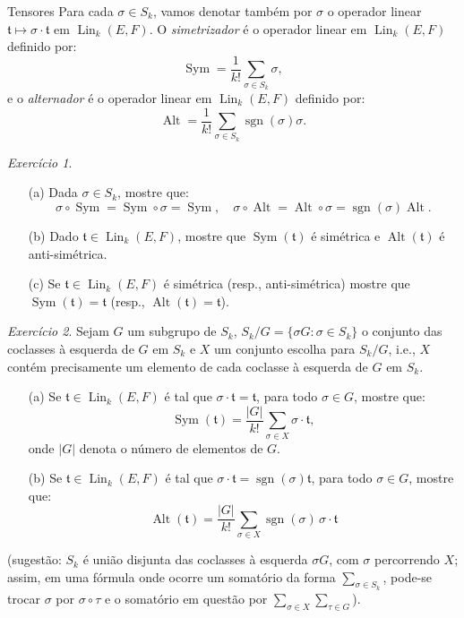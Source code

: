 \documentclass[oneside,11pt]{amsart}
\DeclareMathOperator{\Lin}{Lin}
\DeclareMathOperator{\sgn}{sgn}
\DeclareMathOperator{\Sym}{Sym}
\DeclareMathOperator{\Alt}{Alt}
\theoremstyle{remark}\newtheorem{exercise}{Exercício}[section]
\theoremstyle{plain}\newtheorem{teo}{Teorema}[section]
\theoremstyle{plain}\newtheorem{lem}[teo]{Lema}
\theoremstyle{plain}\newtheorem{prop}[teo]{Proposição}
\theoremstyle{definition}\newtheorem{defin}[teo]{Definição}
\theoremstyle{remark}\newtheorem{rem}[teo]{Observação}
\theoremstyle{definition}\newtheorem{example}[teo]{Exemplo}
\numberwithin{equation}{section}
\begin{document}
\begin{section}{Tensores}
Para cada $\sigma\in S_k$, vamos denotar também por $\sigma$ o operador linear $\mathfrak t\mapsto\sigma\cdot\mathfrak t$ em $\Lin_k(E,F)$.
O {\em simetrizador\/} é o operador linear em $\Lin_k(E,F)$ definido por:
\[\Sym=\frac1{k!}\sum_{\sigma\in S_k}\sigma,\]
e o {\em alternador\/} é o operador linear em $\Lin_k(E,F)$ definido por:
\[\Alt=\frac1{k!}\sum_{\sigma\in S_k}\sgn(\sigma)\sigma.\]

\begin{exercise}\label{exe:sigmaSymAlt}\
\begin{itemize}
\item[(a)] Dada $\sigma\in S_k$, mostre que:
\[\sigma\circ\Sym=\Sym\circ\sigma=\Sym,\quad\sigma\circ\Alt=\Alt\circ\sigma=\sgn(\sigma)\Alt.\]
\item[(b)] Dado $\mathfrak t\in\Lin_k(E,F)$, mostre que $\Sym(\mathfrak t)$ é simétrica e $\Alt(\mathfrak t)$ é anti-simétrica.
\item[(c)] Se $\mathfrak t\in\Lin_k(E,F)$ é simétrica (resp., anti-simétrica) mostre que $\Sym(\mathfrak t)=\mathfrak t$ (resp.,
$\Alt(\mathfrak t)=\mathfrak t$).
\end{itemize}
\end{exercise}

\begin{exercise}\label{exe:SymAltG}
Sejam $G$ um subgrupo de $S_k$, $S_k/G=\big\{\sigma G:\sigma\in S_k\big\}$ o conjunto das coclasses à esquerda de $G$ em $S_k$ e $X$ um conjunto escolha para
$S_k/G$, i.e., $X$ contém precisamente um elemento de cada coclasse à esquerda de $G$ em $S_k$.
\begin{itemize}
\item[(a)] Se $\mathfrak t\in\Lin_k(E,F)$ é tal que $\sigma\cdot\mathfrak t=\mathfrak t$, para todo $\sigma\in G$, mostre que:
\[\Sym(\mathfrak t)=\frac{\vert G\vert}{k!}\sum_{\sigma\in X}\sigma\cdot\mathfrak t,\]
onde $\vert G\vert$ denota o número de elementos de $G$.
\item[(b)] Se $\mathfrak t\in\Lin_k(E,F)$ é tal que $\sigma\cdot\mathfrak t=\sgn(\sigma)\mathfrak t$, para todo $\sigma\in G$, mostre que:
\[\Alt(\mathfrak t)=\frac{\vert G\vert}{k!}\sum_{\sigma\in X}\sgn(\sigma)\,\sigma\cdot\mathfrak t\]
\end{itemize}
(sugestão: $S_k$ é união disjunta das coclasses à esquerda $\sigma G$, com $\sigma$ percorrendo $X$; assim, em uma fórmula onde ocorre
um somatório da forma $\sum_{\sigma\in S_k}$, pode-se trocar $\sigma$ por $\sigma\circ\tau$ e o somatório em questão por $\sum_{\sigma\in X}\sum_{\tau\in G}$).
\end{exercise}


\end{section}
\end{document}
